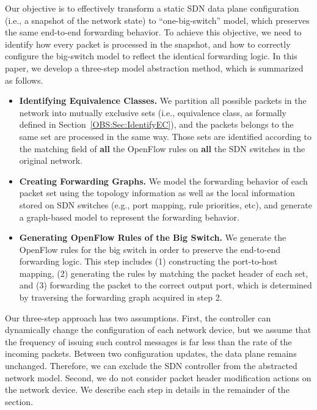 \label{OBS:Sec:Design}

Our objective is to effectively transform a static SDN data plane configuration (i.e., a snapshot of the network state)
to ``one-big-switch'' model, which preserves the same end-to-end forwarding behavior.
To achieve this objective, we need to identify how every packet is processed in the snapshot,
and how to correctly configure the big-switch model to reflect the identical forwarding logic.
In this paper, we develop a three-step model abstraction method, which is summarized as follows.

\begin{itemize}
    \item \textbf{Identifying Equivalence Classes.} We partition all possible packets in the network into mutually exclusive sets
        (i.e., equivalence class, as formally defined in Section~\ref{OBS:Sec:IdentifyEC}), and the packets belongs to the same set are processed in the same way.
        Those sets are identified according to the matching field of \textbf{all} the OpenFlow rules on \textbf{all} the SDN switches in the original network.
    \item \textbf{Creating Forwarding Graphs.} We model the forwarding behavior of each packet set using the topology information
        as well as the local information stored on SDN switches (e.g., port mapping, rule priorities, etc),
        and generate a graph-based model to represent the forwarding behavior.
    \item \textbf{Generating OpenFlow Rules of the Big Switch.} We generate the OpenFlow rules for the big switch
        in order to preserve the end-to-end forwarding logic.
        This step includes (1) constructing the port-to-host mapping,
        (2) generating the rules by matching the packet header of each set,
        and (3) forwarding the packet to the correct output port, which is determined by traversing the forwarding graph acquired in step 2.
\end{itemize}

Our three-step approach has two assumptions. First, the controller can dynamically change the configuration of each network device,
but we assume that the frequency of issuing such control messages is far less than the rate of the incoming packets.
Between two configuration updates, the data plane remains unchanged.
Therefore, we can exclude the SDN controller from the abstracted network model.
Second, we do not consider packet header modification actions on the network device.
We describe each step in details in the remainder of the section.

